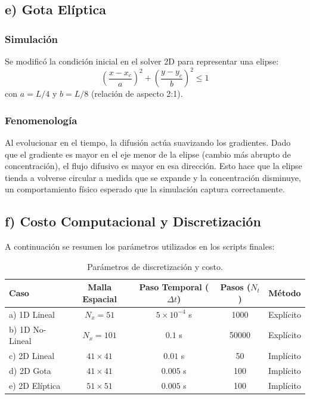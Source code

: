 \documentclass[a4paper,12pt]{article}
\begin{document}
\subsection{e) Gota Elíptica}

\subsubsection*{Simulación}
Se modificó la condición inicial en el solver 2D para representar una elipse:
\begin{equation}
    \left(\frac{x-x_c}{a}\right)^2 + \left(\frac{y-y_c}{b}\right)^2 \le 1
\end{equation}
con $a = L/4$ y $b = L/8$ (relación de aspecto 2:1).

\subsubsection*{Fenomenología}
Al evolucionar en el tiempo, la difusión actúa suavizando los gradientes. Dado que el gradiente es mayor en el eje menor de la elipse (cambio más abrupto de concentración), el flujo difusivo es mayor en esa dirección. Esto hace que la elipse tienda a volverse circular a medida que se expande y la concentración disminuye, un comportamiento físico esperado que la simulación captura correctamente.

\subsection{f) Costo Computacional y Discretización}

A continuación se resumen los parámetros utilizados en los scripts finales:

\begin{table}[H]
    \centering
    \begin{tabular}{lcccc}
        \toprule
        \textbf{Caso} & \textbf{Malla Espacial} & \textbf{Paso Temporal ($\Delta t$)} & \textbf{Pasos ($N_t$)} & \textbf{Método} \\
        \midrule
        a) 1D Lineal & $N_x=51$ & $5 \times 10^{-4}$ s & 1000 & Explícito \\
        b) 1D No-Lineal & $N_x=101$ & $0.1$ s & 50000 & Explícito \\
        c) 2D Lineal & $41 \times 41$ & $0.01$ s & 50 & Implícito \\
        d) 2D Gota & $41 \times 41$ & $0.005$ s & 100 & Implícito \\
        e) 2D Elíptica & $51 \times 51$ & $0.005$ s & 100 & Implícito \\
        \bottomrule
    \end{tabular}
    \caption{Parámetros de discretización y costo.}
\end{table}
\end{document}
